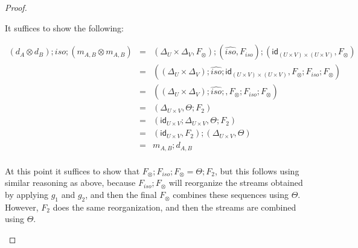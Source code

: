 \documentclass{elsarticle}
\newcommand{\id}[0]{\mathsf{id}}
\begin{document}
\begin{proof}
\begin{report}
\begin{itemize}
    It suffices to show the following:
    \begin{center}
      \begin{math}
        \begin{array}{lll}
          (d_A \otimes d_B);iso;(m_{A,B} \otimes m_{A,B})
          & = & (\Delta_U \times \Delta_V,F_\otimes);(\hat{iso},F_{iso});(\id_{(U \times V) \times (U \times V)},F_\otimes)\\
          & = & ((\Delta_U \times \Delta_V);\hat{iso};\id_{(U \times V) \times (U \times V)},F_\otimes;F_{iso};F_\otimes)\\
          & = & ((\Delta_U \times \Delta_V);\hat{iso};,F_\otimes;F_{iso};F_\otimes)\\
          & = & (\Delta_{U \times V},\Theta;F_2)\\
          & = & (\id_{U \times V};\Delta_{U \times V},\Theta;F_2)\\
          & = & (\id_{U \times V},F_2);(\Delta_{U \times V},\Theta)\\
          & = & m_{A,B};d_{A,B}\\
        \end{array}
      \end{math}
    \end{center}
    At this point it suffices to show that
    $F_\otimes;F_{iso};F_\otimes = \Theta;F_2$, but this follows using
    similar reasoning as above, because $F_{iso};F_\otimes$ will
    reorganize the streams obtained by applying $g_1$ and $g_2$, and
    then the final $F_\otimes$ combines these sequences using $\Theta$.
    However, $F_2$ does the same reorganization, and then the streams
    are combined using $\Theta$.



\end{itemize}
\end{report}
\end{proof}
\end{document}
